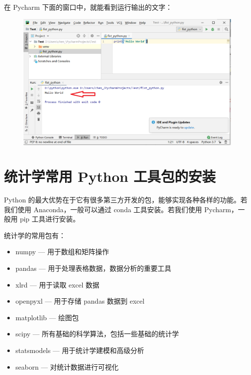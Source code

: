 在 Pycharm 下面的窗口中，就能看到运行输出的文字：

\begin{figure}[!ht]
  \centering
  \includegraphics[scale=0.5]{figure/chapter1/pycharm18.png}
\end{figure}

\clearpage
\section{统计学常用 Python 工具包的安装}

Python 的最大优势在于它有很多第三方开发的包，能够实现各种各样的功能。若我们使用 Anaconda，一般可以通过 conda 工具安装。若我们使用 Pycharm，一般用 pip 工具进行安装。

统计学的常用包有：

\vspace{5pt}
\begin{itemize}
  \item numpy --- 用于数组和矩阵操作

  \item pandas --- 用于处理表格数据，数据分析的重要工具

  \item xlrd --- 用于读取 excel 数据

  \item openpyxl --- 用于存储 pandas 数据到 excel

  \item matplotlib --- 绘图包

  \item scipy --- 所有基础的科学算法，包括一些基础的统计学

  \item statsmodels --- 用于统计学建模和高级分析


  \item seaborn --- 对统计数据进行可视化

\end{itemize}
\vspace{5pt}

